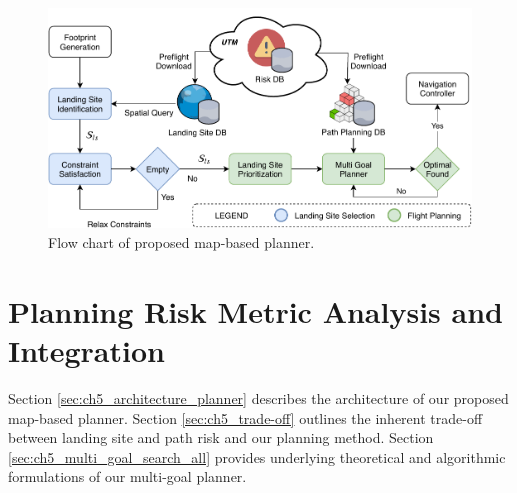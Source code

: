 

\begin{figure}[!t]
  \centering
  \includegraphics[width=0.75\linewidth]{chapter_5_mapping/imgs/architecture_planning.pdf}
  \caption{Flow chart of proposed map-based planner.}
  \label{fig:ch5_architecture_overview}
\end{figure}


\section{Planning Risk Metric Analysis and Integration}\label{sec:ch5_mapbased_planner}
Section \ref{sec:ch5_architecture_planner} describes the architecture of our proposed map-based planner. Section \ref{sec:ch5_trade-off} outlines the inherent trade-off between landing site and path risk and our planning method. Section \ref{sec:ch5_multi_goal_search_all} provides underlying theoretical and algorithmic formulations of our multi-goal planner.

